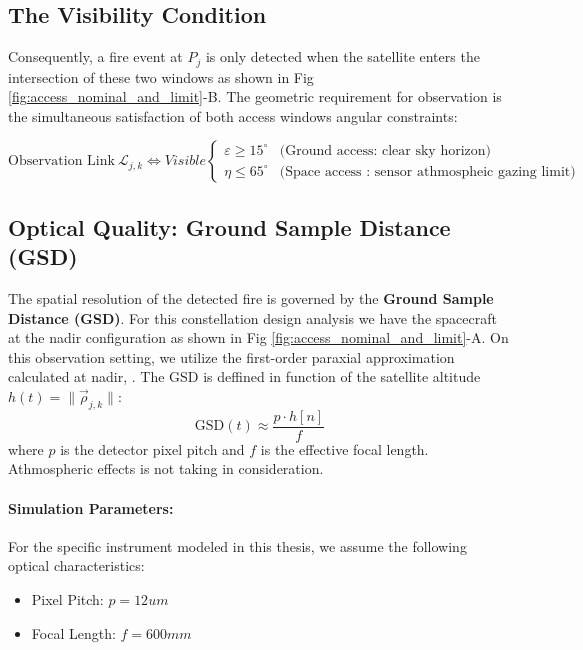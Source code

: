 \subsection{The Visibility Condition}
Consequently, a fire event at $P_j$ is only detected when the satellite enters the intersection of these two windows as shown in Fig \ref{fig:access_nominal_and_limit}-B. The geometric requirement for observation is the simultaneous satisfaction of both access windows angular constraints:

\begin{equation}
    \text{Observation Link} \ \mathcal{L}_{j,k} \iff Visible
    \begin{cases} 
        \varepsilon \geq 15^{\circ} & \text{(Ground access: clear sky horizon)} \\
        \eta \leq 65^{\circ} & \text{(Space access : sensor athmospheic gazing limit)}
    \end{cases}
\end{equation}

\subsection{Optical Quality: Ground Sample Distance (GSD)}
\label{optical-quality}
The spatial resolution of the detected fire is governed by the \textbf{Ground Sample Distance (GSD)}. For this constellation design analysis we have the spacecraft at the nadir configuration as shown in Fig \ref{fig:access_nominal_and_limit}-A. On this observation setting, we utilize the first-order paraxial approximation calculated at nadir, . The GSD is deffined in function of the satellite altitude $h(t) = \|  \vec{\rho}_{j,k}  \|$:
\begin{equation}
    \text{GSD}(t) \approx \frac{p \cdot h[n]}{f}
    \label{eq:gsd}
\end{equation}
where $p$ is the detector pixel pitch and $f$ is the effective focal length. Athmospheric effects is not taking in consideration. 

\paragraph{Simulation Parameters:}
For the specific instrument modeled in this thesis, we assume the following optical characteristics:
\begin{itemize}
    \item Pixel Pitch: $p = 12um $ 
    \item Focal Length: $f = 600mm$ 
\end{itemize}

